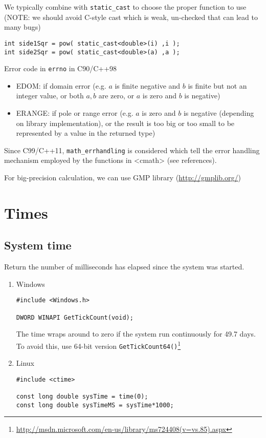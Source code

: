 We typically combine with \verb!static_cast! to choose the proper function to
use (NOTE: we should avoid C-style cast which is weak, un-checked that can lead
to many bugs)
\begin{lstlisting}
int side1Sqr = pow( static_cast<double>(i) ,i );
int side2Sqr = pow( static_cast<double>(a) ,a );
\end{lstlisting}
Error code in \verb!errno! in C90/C++98
\begin{itemize}
  \item EDOM: if domain error (e.g. $a$ is finite negative and $b$ is finite
  but not an integer value, or both $a,b$ are zero, or $a$ is zero and $b$ is
  negative)
  \item ERANGE: if pole or range error (e.g. $a$ is zero and $b$ is
  negative (depending on library implementation), or the result is too big or
  too small to be represented by a value in the returned type)
\end{itemize}
Since C99/C++11, \verb!math_errhandling! is considered which tell the error
handling mechanism employed by the functions in <cmath> (see references).


For big-precision calculation, we can use GMP library (\url{http://gmplib.org/})


\section{Times}


\subsection{System time}

Return the number of milliseconds has elapsed since the system was started.
\begin{enumerate}
  \item Windows
\begin{verbatim}
#include <Windows.h>

DWORD WINAPI GetTickCount(void);
\end{verbatim}
The time wraps around to zero if the system run continuously for 49.7 days. To
avoid this, use 64-bit version
\verb!GetTickCount64()!\footnote{\url{http://msdn.microsoft.com/en-us/library/ms724408(v=vs.85).aspx}}


  \item Linux
\begin{verbatim}
#include <ctime>

const long double sysTime = time(0);
const long double sysTimeMS = sysTime*1000;
\end{verbatim}

\end{enumerate}

